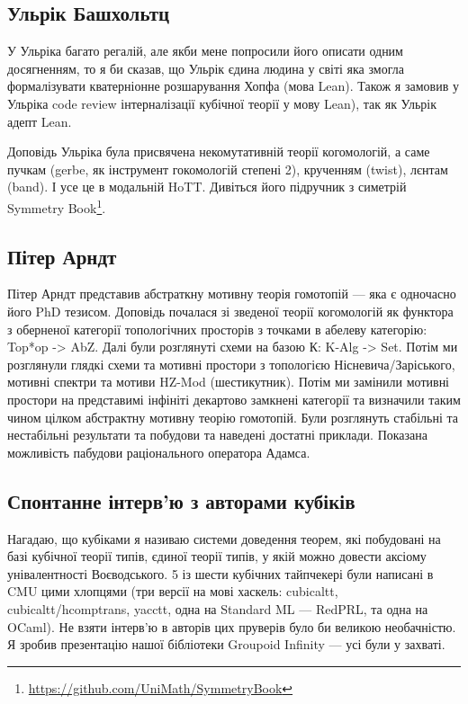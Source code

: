 \subsection*{Ульрік Башхольтц}

У Ульріка багато регалій, але якби мене попросили його описати одним
досягненням, то я би сказав, що Ульрік єдина людина у світі яка змогла
формалізувати кватерніонне розшарування Хопфа (мова Lean). Також я
замовив у Ульріка code review інтерналізації кубічної теорії у мову
Lean), так як Ульрік адепт Lean.

Доповідь Ульріка була присвячена некомутативній теорії когомологій,
а саме пучкам (gerbe, як інструмент гокомологій степені 2),
крученням (twist), лєнтам (band). І усе це в модальній HoTT.
Дивіться його підручник з симетрій Symmetry Book\footnote{\url{https://github.com/UniMath/SymmetryBook}}.

\subsection*{Пітер Арндт}

Пітер Арндт представив абстраткну мотивну теорія гомотопій ---
яка є одночасно його PhD тезисом. Доповідь почалася зі зведеної
теорії когомологій як функтора з оберненої категорії топологічних
просторів з точками в абелеву категорію: Top*op -> AbZ. Далі були
розглянуті схеми на базою К: K-Alg -> Set. Потім ми розглянули
глядкі схеми та мотивні простори з топологією Нісневича/Заріського,
мотивні спектри та мотиви HZ-Mod (шестикутник). Потім ми замінили
мотивні простори на представимі інфініті декартово замкнені категорії
та визначили таким чином цілком абстрактну мотивну теорію гомотопій.
Були розглянуть стабільні та нестабільні результати та побудови та
наведені достатні приклади. Показана можливість пабудови
раціонального оператора Адамса.

\subsection*{Спонтанне інтерв'ю з авторами кубіків}

Нагадаю, що кубіками я називаю системи доведення теорем,
які побудовані на базі кубічної теорії типів, єдиної теорії типів,
у якій можно довести аксіому унівалентності Воєводського. 5 із шести
кубічних тайпчекері були написані в CMU цими хлопцями (три версії
на мові хаскель: cubicaltt, cubicaltt/hcomptrans, yacctt, одна на
Standard ML --- RedPRL, та одна на OCaml). Не взяти інтерв'ю в авторів
цих пруверів було би великою необачністю. Я зробив презентацію нашої
бібліотеки Groupoid Infinity --- усі були у захваті.

